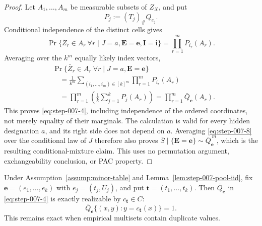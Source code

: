 \begin{proof}
Let \(A_1,\ldots,A_m\) be measurable subsets of \(Z_X\), and put
\[
P_j:=(T_j)_\#Q_{e_j}.
\tag{6}\label{eq:step-007-6}
\]
Conditional independence of the distinct cells gives
\[
\Pr\{\bar Z_r\in A_r\ \forall r\mid
J=a,\mathbf E=\mathbf e,\mathbf I=\mathbf i\}
=\prod_{r=1}^m P_{i_r}(A_r).
\tag{7}\label{eq:step-007-7}
\]
Averaging over the \(k^m\) equally likely index vectors,
\[
\begin{aligned}
&\Pr\{\bar Z_r\in A_r\ \forall r\mid
J=a,\mathbf E=\mathbf e\}\\
&\quad=
\frac1{k^m}
\sum_{(i_1,\ldots,i_m)\in[k]^m}
\prod_{r=1}^mP_{i_r}(A_r)\\
&\quad=
\prod_{r=1}^m
\left(\frac1k\sum_{j=1}^kP_j(A_r)\right)
=\prod_{r=1}^m\bar Q_{\mathbf e}(A_r).
\end{aligned}
\tag{8}\label{eq:step-007-8}
\]
This proves \eqref{eq:step-007-4}, including independence of the ordered coordinates,
not merely equality of their marginals.  The calculation is valid for
every hidden designation \(a\), and its right side does not depend on
\(a\).  Averaging \eqref{eq:step-007-8} over the conditional law of \(J\) therefore
also proves \(\bar S\mid\{\mathbf E=\mathbf e\}\sim
\bar Q_{\mathbf e}^{\,m}\), which is the resulting conditional-mixture
claim.  This uses no permutation argument, exchangeability conclusion,
or PAC property.

\end{proof}


\begin{proposition}
\label{prop:step-007-realizable}

Under Assumption~\ref{assump:minor-table} and
Lemma~\ref{lem:step-007-pool-iid}, fix
\(\mathbf e=(e_1,\ldots,e_k)\) with
\(e_j=(t_j,U_j)\), and put
\(\mathbf t=(t_1,\ldots,t_k)\).  Then
\(\bar Q_{\mathbf e}\) in \eqref{eq:step-007-4} is exactly realizable by
\(c_{\mathbf t}\in C\):
\[
\bar Q_{\mathbf e}
\bigl\{(x,y):y=c_{\mathbf t}(x)\bigr\}=1.
\tag{9}\label{eq:step-007-9}
\]
This remains exact when empirical multisets contain duplicate values.

\end{proposition}

